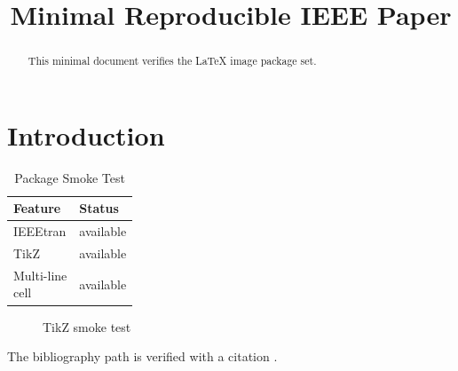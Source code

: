 \documentclass[conference]{IEEEtran}
\begin{document}
\title{Minimal Reproducible IEEE Paper}

\author{
}

\maketitle

\begin{abstract}
This minimal document verifies the LaTeX image package set.
\end{abstract}

\section{Introduction}


\begin{table}[h]
\centering
\caption{Package Smoke Test}
\begin{tabular}{ll}
\toprule
Feature & Status \\
\midrule
IEEEtran & available \\
TikZ & available \\
\makecell{Multi-line\\cell} & available \\
\bottomrule
\end{tabular}
\end{table}

\begin{figure}[h]
\centering
{}
\caption{TikZ smoke test}
\end{figure}

The bibliography path is verified with a citation \cite{example}.

\balance


\end{document}
